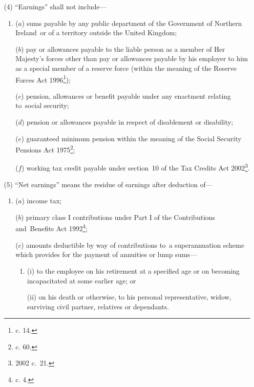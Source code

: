 \documentclass[12pt,a4paper]{article}
\begin{document}
(4) “Earnings” shall not include—
\begin{enumerate}\item[]
($a$) sums payable by any public department of the Government of Northern Ireland~or of a territory outside the United Kingdom;

($b$) pay or allowances payable to the liable person as a member of Her Majesty’s forces
other than pay or allowances payable by his employer to him as a special member of a reserve force (within the meaning of the Reserve Forces Act 1996\footnote{ c. 14.});  %

($c$) pension, allowances or benefit payable under any enactment relating to~social security;

($d$) pension or allowances payable in respect of disablement or disability;

($e$) guaranteed minimum pension within the meaning of the Social Security Pensions Act 1975\footnote{ c. 60.};

($f$) working tax credit payable under section~10 of the Tax Credits Act 2002\footnote{2002 c.\ 21.}.
\end{enumerate}

(5) “Net earnings” means the residue of earnings after deduction of—
\begin{enumerate}\item[]
($a$) income tax;

($b$) primary class I contributions under Part I of the Contributions and~Benefits Act 1992\footnote{ c. 4.};

($c$) amounts deductible by way of contributions to~a superannuation scheme which provides for the payment of annuities or 
lump %
sums—
\begin{enumerate}\item[]
(i) to the employee on his retirement at a specified age or on becoming incapacitated at some earlier age; or

(ii) on his death or otherwise, to his personal representative, widow, 
surviving civil partner,  %
relatives or dependants.
\end{enumerate}
\end{enumerate}
\end{document}
